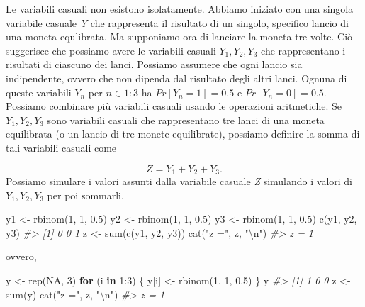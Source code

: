 \documentclass[
  11pt,
]{krantz}
\makeatletter
\newenvironment{Shaded}{\begin{snugshade}}{\end{snugshade}}
\newcommand{\CommentTok}[1]{\textcolor[rgb]{0.37,0.37,0.37}{\textit{#1}}}
\newcommand{\ConstantTok}[1]{\textcolor[rgb]{0,0,0}{#1}}
\newcommand{\ControlFlowTok}[1]{\textcolor[rgb]{0.27,0.27,0.27}{\textbf{#1}}}
\newcommand{\DecValTok}[1]{\textcolor[rgb]{0.06,0.06,0.06}{#1}}
\newcommand{\FloatTok}[1]{\textcolor[rgb]{0.06,0.06,0.06}{#1}}
\newcommand{\FunctionTok}[1]{\textcolor[rgb]{0,0,0}{#1}}
\newcommand{\NormalTok}[1]{#1}
\newcommand{\OtherTok}[1]{\textcolor[rgb]{0.37,0.37,0.37}{#1}}
\newcommand{\SpecialCharTok}[1]{\textcolor[rgb]{0,0,0}{#1}}
\newcommand{\StringTok}[1]{\textcolor[rgb]{0.5,0.5,0.5}{#1}}
\newenvironment{kframe}{%
\medskip{}
\setlength{\fboxsep}{.8em}
 \def\at@end@of@kframe{}%
 \ifinner\ifhmode%
  \def\at@end@of@kframe{\end{minipage}}%
  \begin{minipage}{\columnwidth}%
 \fi\fi%
 \def\FrameCommand##1{\hskip\@totalleftmargin \hskip-\fboxsep
 \colorbox{shadecolor}{##1}\hskip-\fboxsep
     \hskip-\linewidth \hskip-\@totalleftmargin \hskip\columnwidth}%
 \MakeFramed {\advance\hsize-\width
   \@totalleftmargin\z@ \linewidth\hsize
   \@setminipage}}%
 {\par\unskip\endMakeFramed%
 \at@end@of@kframe}
\renewenvironment{Shaded}{\begin{kframe}}{\end{kframe}}
\theoremstyle{definition}
\theoremstyle{definition}
\theoremstyle{definition}
\theoremstyle{definition}
\theoremstyle{remark}
\makeatother
\begin{document}
Le variabili casuali non esistono isolatamente. Abbiamo iniziato con una singola variabile casuale \emph{Y} che rappresenta il risultato di un singolo, specifico lancio di una moneta equlibrata. Ma supponiamo ora di lanciare la moneta tre volte. Ciò suggerisce che possiamo avere le variabili casuali \(Y_1 , Y_2 , Y_3\) che rappresentano i risultati di ciascuno dei lanci. Possiamo assumere che ogni lancio sia indipendente, ovvero che non dipenda dal risultato degli altri lanci. Ognuna di queste variabili \(Y_n\) per \(n \in 1:3\) ha \(Pr[Y_n =1]=0.5\) e \(Pr[Y_n =0]=0.5\). Possiamo combinare più variabili casuali usando le operazioni aritmetiche. Se \(Y_1 , Y_2, Y_3\) sono variabili casuali che rappresentano tre lanci di una moneta equilibrata (o un lancio di tre monete equilibrate), possiamo definire la somma di tali variabili casuali come

\[
Z = Y_1 + Y_2 + Y_3.
\] \noindent Possiamo simulare i valori assunti dalla variabile casuale \emph{Z} simulando i valori di \(Y_1, Y_2, Y_3\) per poi sommarli.

\begin{Shaded}
\begin{Highlighting}[]
\NormalTok{y1 }\OtherTok{\textless{}{-}} \FunctionTok{rbinom}\NormalTok{(}\DecValTok{1}\NormalTok{, }\DecValTok{1}\NormalTok{, }\FloatTok{0.5}\NormalTok{)}
\NormalTok{y2 }\OtherTok{\textless{}{-}} \FunctionTok{rbinom}\NormalTok{(}\DecValTok{1}\NormalTok{, }\DecValTok{1}\NormalTok{, }\FloatTok{0.5}\NormalTok{)}
\NormalTok{y3 }\OtherTok{\textless{}{-}} \FunctionTok{rbinom}\NormalTok{(}\DecValTok{1}\NormalTok{, }\DecValTok{1}\NormalTok{, }\FloatTok{0.5}\NormalTok{)}
\FunctionTok{c}\NormalTok{(y1, y2, y3)}
\CommentTok{\#\textgreater{} [1] 0 0 1}
\NormalTok{z }\OtherTok{\textless{}{-}} \FunctionTok{sum}\NormalTok{(}\FunctionTok{c}\NormalTok{(y1, y2, y3))}
\FunctionTok{cat}\NormalTok{(}\StringTok{"z ="}\NormalTok{, z, }\StringTok{"}\SpecialCharTok{\textbackslash{}n}\StringTok{"}\NormalTok{)}
\CommentTok{\#\textgreater{} z = 1}
\end{Highlighting}
\end{Shaded}

\noindent ovvero,

\begin{Shaded}
\begin{Highlighting}[]
\NormalTok{y }\OtherTok{\textless{}{-}} \FunctionTok{rep}\NormalTok{(}\ConstantTok{NA}\NormalTok{, }\DecValTok{3}\NormalTok{)}
\ControlFlowTok{for}\NormalTok{ (i }\ControlFlowTok{in} \DecValTok{1}\SpecialCharTok{:}\DecValTok{3}\NormalTok{) \{}
\NormalTok{  y[i] }\OtherTok{\textless{}{-}} \FunctionTok{rbinom}\NormalTok{(}\DecValTok{1}\NormalTok{, }\DecValTok{1}\NormalTok{, }\FloatTok{0.5}\NormalTok{)}
\NormalTok{\}}
\NormalTok{y}
\CommentTok{\#\textgreater{} [1] 1 0 0}
\NormalTok{z }\OtherTok{\textless{}{-}} \FunctionTok{sum}\NormalTok{(y)}
\FunctionTok{cat}\NormalTok{(}\StringTok{"z ="}\NormalTok{, z, }\StringTok{"}\SpecialCharTok{\textbackslash{}n}\StringTok{"}\NormalTok{)}
\CommentTok{\#\textgreater{} z = 1}
\end{Highlighting}
\end{Shaded}
\end{document}
